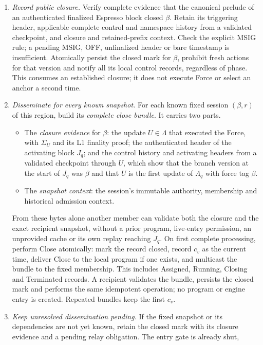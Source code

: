 \documentclass[11pt,a4paper]{article}
\newcommand{\defterm}[1]{\textcolor{rrBlue}{\textit{#1}}}
\begin{document}
\begin{enumerate}[label=(\roman*),itemsep=2pt]
\item \emph{Record public closure.} Verify complete evidence that the
canonical prelude of an authenticated finalized Espresso block closed
$\beta$. Retain its triggering header, applicable complete control and
namespace history from a validated checkpoint, and closure and
retained-prefix context. Check the explicit MSIG rule; a pending
MSIG, OFF, unfinalized header or bare timestamp is insufficient.
Atomically persist the closed mark for $\beta$, prohibit fresh actions for
that version and notify all its local control records, regardless of
phase. This consumes an established closure; it does not execute Force
or select an anchor a second time.
\item \emph{Disseminate for every known snapshot.} For each known fixed
session $(\beta,r)$ of this region, build its \defterm{complete close
bundle}. It carries two parts.
 \begin{itemize}
 \item The \emph{closure evidence} for $\beta$: the update $U\in\Lambda$
 that executed the Force, with $\Sigma_U$ and its L1 finality proof; the
 authenticated header of the activating block $J_q$; and the control
 history and activating headers from a validated checkpoint through
 $U$, which show that the branch version at the start of $J_q$ was
 $\beta$ and that $U$ is the first update of $\Lambda_q$ with force tag
 $\beta$.
 \item The \emph{snapshot context}: the session's immutable authority,
 membership and historical admission context.
 \end{itemize}
From these bytes alone another member can validate both the closure and
the exact recipient snapshot, without a prior program, live-entry
permission, an unprovided cache or its own replay reaching $J_q$. On first complete
processing, perform Close atomically: mark the record closed, record
$c_v$ as the current time, deliver Close to the local program if one
exists, and multicast the bundle to the fixed membership. This includes
Assigned, Running, Closing and Terminated records. A recipient validates
the bundle, persists the closed mark and performs the same idempotent operation;
no program or engine entry is created. Repeated bundles keep the first $c_v$.
\item \emph{Keep unresolved dissemination pending.} If the fixed snapshot or
its dependencies are not yet known, retain the closed mark with its
closure evidence and a pending relay obligation. The entry gate is already shut,

\end{enumerate}
\end{document}
